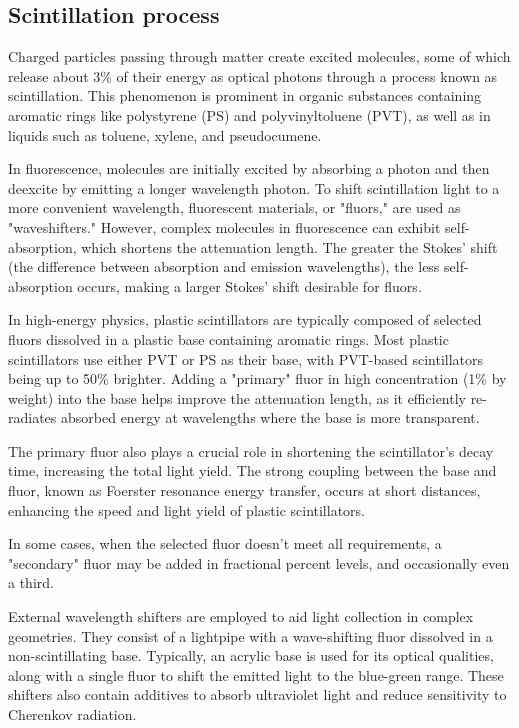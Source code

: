 \begin{refsection}
    \subsection{Scintillation process}
        Charged particles passing through matter create excited molecules, some of which release about 3\% of their energy as optical photons through a process known as scintillation. This phenomenon is prominent in organic substances containing aromatic rings like polystyrene (PS) and polyvinyltoluene (PVT), as well as in liquids such as toluene, xylene, and pseudocumene.

        In fluorescence, molecules are initially excited by absorbing a photon and then deexcite by emitting a longer wavelength photon. To shift scintillation light to a more convenient wavelength, fluorescent materials, or "fluors," are used as "waveshifters." However, complex molecules in fluorescence can exhibit self-absorption, which shortens the attenuation length. The greater the Stokes' shift (the difference between absorption and emission wavelengths), the less self-absorption occurs, making a larger Stokes' shift desirable for fluors.

        In high-energy physics, plastic scintillators are typically composed of selected fluors dissolved in a plastic base containing aromatic rings. Most plastic scintillators use either PVT or PS as their base, with PVT-based scintillators being up to 50\% brighter. Adding a "primary" fluor in high concentration (1\% by weight) into the base helps improve the attenuation length, as it efficiently re-radiates absorbed energy at wavelengths where the base is more transparent.

        The primary fluor also plays a crucial role in shortening the scintillator's decay time, increasing the total light yield. The strong coupling between the base and fluor, known as Foerster resonance energy transfer, occurs at short distances, enhancing the speed and light yield of plastic scintillators.

        In some cases, when the selected fluor doesn't meet all requirements, a "secondary" fluor may be added in fractional percent levels, and occasionally even a third.

        External wavelength shifters are employed to aid light collection in complex geometries. They consist of a lightpipe with a wave-shifting fluor dissolved in a non-scintillating base. Typically, an acrylic base is used for its optical qualities, along with a single fluor to shift the emitted light to the blue-green range. These shifters also contain additives to absorb ultraviolet light and reduce sensitivity to Cherenkov radiation.


\end{refsection}
